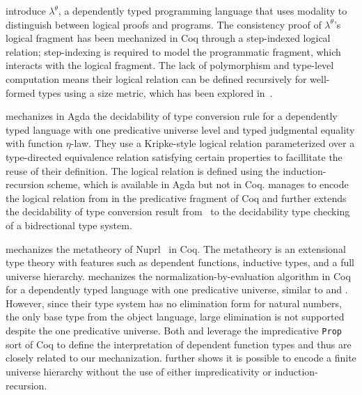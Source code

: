 \documentclass[acmsmall,screen=true,
\ifpublic review=false\else,review=true\fi
  ,anonymous=\ifanonymous true\else false\fi]{acmart}
\newcommand{\yl}[1]{}
\begin{document}
\citet{casinghino:combining-proofs-programs} introduce $\lambda^\theta$, a dependently typed
programming language that uses modality to distinguish between logical
proofs and programs. %
The consistency proof of $\lambda^\theta$'s logical fragment has been
mechanized in Coq through a step-indexed logical relation;
step-indexing is required to model the programmatic fragment, which
interacts with the logical fragment.
The lack of polymorphism and type-level computation means their
logical relation can be defined recursively for well-formed types using
a size metric, which has been explored in~\citet{liu2023dependently}.

\citet{decagda} mechanizes in Agda the decidability of type
conversion rule for a dependently typed language with one predicative
universe level and typed judgmental equality with function
$\eta$-law. They
use a Kripke-style logical relation parameterized over a
type-directed equivalence relation satisfying certain
properties to facillitate the reuse of their definition. The
logical relation is defined using the induction-recursion scheme,
which is available in Agda but not in Coq.
\citet{martin-lof-a-la-coq} manages to encode the logical relation
from \citet{decagda} in the predicative fragment of Coq and further
extends the decidability of type conversion result
from~\citet{decagda} to the decidability type checking of a
bidrectional type system.

\citet{anand2014towards} mechanizes the metatheory of
Nuprl~\citep{constable1986implementing} in Coq. The metatheory is an
extensional type theory with features such as dependent functions,
inductive types, and a full universe hierarchy. \citet{nbeincoq}
mechanizes the normalization-by-evaluation algorithm in Coq for a
dependently typed language with one predicative universe, similar to
\citet{decagda} and \citet{martin-lof-a-la-coq}. However, since their
type system has no elimination form for natural numbers, the
only base type from the object language, large elimination is not
supported despite the one predicative universe.
Both \citet{anand2014towards} and \citet{nbeincoq} leverage the
impredicative \texttt{Prop} sort of Coq to define the interpretation
of dependent function types and thus are closely related to our
mechanization. \citet{anand2014towards} further shows it is possible
to encode a finite universe hierarchy without the use of
either impredicativity or induction-recursion.
\end{document}
